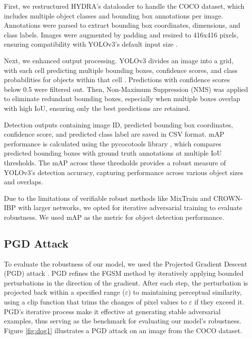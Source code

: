 \documentclass[10pt]{cai}
\begin{document}
First, we restructured HYDRA's dataloader to handle the COCO dataset, which includes multiple object classes and bounding box annotations per image. Annotations were parsed to extract bounding box coordinates, dimensions, and class labels. Images were augmented by padding and resized to 416x416 pixels, ensuring compatibility with YOLOv3's default input size \cite{redmon2018yolov3incrementalimprovement}.

Next, we enhanced output processing. YOLOv3 divides an image into a grid, with each cell predicting multiple bounding boxes, confidence scores, and class probabilities for objects within that cell \cite{redmon2018yolov3incrementalimprovement}. Predictions with confidence scores below 0.5 were filtered out. Then, Non-Maximum Suppression (NMS) \cite{nms} was applied to eliminate redundant bounding boxes, especially when multiple boxes overlap with high IoU, ensuring only the best predictions are retained.

Detection outputs containing image ID, predicted bounding box coordinates, confidence score, and predicted class label are saved in CSV format. mAP performance is calculated using the pycocotools library \cite{lin2015microsoft}, which compares predicted bounding boxes with ground truth annotations at multiple IoU thresholds. The mAP across these thresholds provides a robust measure of YOLOv3’s detection accuracy, capturing performance across various object sizes and overlaps.

Due to the limitations of verifiable robust methods like MixTrain and CROWN-IBP with larger networks, we opted for iterative adversarial training to evaluate robustness. We used mAP as the metric for object detection performance.

\subsection{PGD Attack}
To evaluate the robustness of our model, we used the Projected Gradient Descent (PGD) attack \cite{madry2019deeplearningmodelsresistant}. PGD refines the FGSM method by iteratively applying bounded perturbations in the direction of the gradient. After each step, the perturbation is projected back within a specified range ($\varepsilon$) to maintaining perceptual similarity, using a clip function that trims the changes of pixel values to $\varepsilon$ if they exceed it. PGD’s iterative process make it effective at generating stable adversarial examples, thus serving as the benchmark for evaluating our model's robustness. Figure \ref{fig:dog1} illustrates a PGD attack on an image from the COCO dataset.
\end{document}
